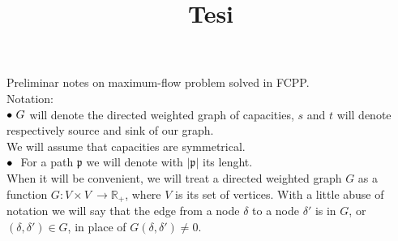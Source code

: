\documentclass{article}
\title{Tesi}
\author{}
\date{}
\theoremstyle{plain}
\theoremstyle{definition}
\theoremstyle{remark}
\begin{document}
Preliminar notes on maximum-flow problem solved in FCPP.\\
Notation:\\
 $\small\bullet\ G$ will denote the directed weighted graph of capacities, 
 $s$ and $t$ will denote respectively source and sink of our graph.\\
We will assume that capacities are symmetrical.\\
 $\small\bullet\ $  For a path $\mathfrak{p}$ we will denote with $|\mathfrak{p}|$ its lenght.\\

When it will be convenient, we will treat a directed weighted graph $G$ as a function $G: V\times V\ \rightarrow \mathbb{R_{+}}$, where $V$ is its set of vertices. With a little abuse of notation we will say that the edge from a node $\delta$ to a node $\delta'$ is in $G$, or $(\delta, \delta') \in G$,  in place of $G(\delta, \delta') \not= 0$.\\
\end{document}
